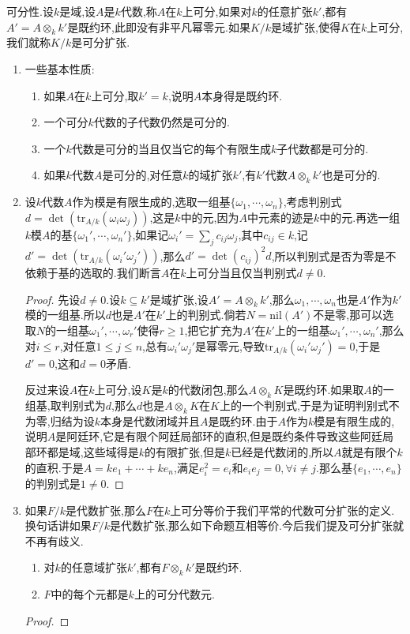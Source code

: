 可分性.设$k$是域,设$A$是$k$代数,称$A$在$k$上可分,如果对$k$的任意扩张$k'$,都有$A'=A\otimes_kk'$是既约环,此即没有非平凡幂零元.如果$K/k$是域扩张,使得$K$在$k$上可分,我们就称$K/k$是可分扩张.
\begin{enumerate}
	\item 一些基本性质:
	\begin{enumerate}
		\item 如果$A$在$k$上可分,取$k'=k$,说明$A$本身得是既约环.
		\item 一个可分$k$代数的子代数仍然是可分的.
		\item 一个$k$代数是可分的当且仅当它的每个有限生成$k$子代数都是可分的.
		\item 如果$k$代数$A$是可分的,对任意$k$的域扩张$k'$,有$k'$代数$A\otimes_kk'$也是可分的.
	\end{enumerate}
	\item 设$k$代数$A$作为模是有限生成的,选取一组基$\{\omega_1,\cdots,\omega_n\}$,考虑判别式$d=\det\left(\mathrm{tr}_{A/k}(\omega_i\omega_j)\right)$,这是$k$中的元,因为$A$中元素的迹是$k$中的元.再选一组$k$模$A$的基$\{\omega_1',\cdots,\omega_n'\}$,如果记$\omega_i'=\sum_jc_{ij}\omega_j$,其中$c_{ij}\in k$,记$d'=\det\left(\mathrm{tr}_{A/k}(\omega_i'\omega_j')\right)$,那么$d'=\det(c_{ij})^2d$,所以判别式是否为零是不依赖于基的选取的.我们断言$A$在$k$上可分当且仅当判别式$d\not=0$.
	\begin{proof}
		
		先设$d\not=0$.设$k\subseteq k'$是域扩张,设$A'=A\otimes_kk'$,那么$\omega_1,\cdots,\omega_n$也是$A'$作为$k'$模的一组基.所以$d$也是$A'$在$k'$上的判别式.倘若$N=\mathrm{nil}(A')$不是零,那可以选取$N$的一组基$\omega_1',\cdots,\omega_r'$使得$r\ge1$,把它扩充为$A'$在$k'$上的一组基$\omega_1',\cdots,\omega_n'$,那么对$i\le r$,对任意$1\le j\le n$,总有$\omega_i'\omega_j'$是幂零元,导致$\mathrm{tr}_{A/k}(\omega_i'\omega_j')=0$,于是$d'=0$,这和$d=0$矛盾.
		
		\qquad
		
		反过来设$A$在$k$上可分,设$K$是$k$的代数闭包,那么$A\otimes_kK$是既约环.如果取$A$的一组基,取判别式为$d$,那么$d$也是$A\otimes_kK$在$K$上的一个判别式,于是为证明判别式不为零,归结为设$k$本身是代数闭域并且$A$是既约环.由于$A$作为$k$模是有限生成的,说明$A$是阿廷环,它是有限个阿廷局部环的直积,但是既约条件导致这些阿廷局部环都是域,这些域得是$k$的有限扩张,但是$k$已经是代数闭的,所以$A$就是有限个$k$的直积.于是$A=ke_1+\cdots+ke_n$,满足$e_i^2=e_i$和$e_ie_j=0,\forall i\not=j$.那么基$\{e_1,\cdots,e_n\}$的判别式是$1\not=0$.
	\end{proof}
	\item 如果$F/k$是代数扩张,那么$F$在$k$上可分等价于我们平常的代数可分扩张的定义.换句话讲如果$F/k$是代数扩张,那么如下命题互相等价.今后我们提及可分扩张就不再有歧义.
	\begin{enumerate}
		\item 对$k$的任意域扩张$k'$,都有$F\otimes_kk'$是既约环.
		\item $F$中的每个元都是$k$上的可分代数元.
	\end{enumerate}
	\begin{proof}
		

\end{proof}
\end{enumerate}
